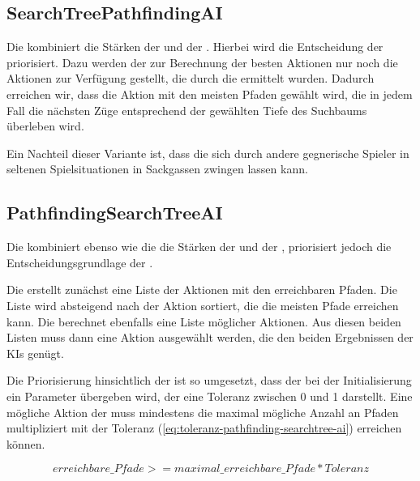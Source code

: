 \subsection{SearchTreePathfindingAI}
\label{subsec:searchtree-pathfinding-ai}

Die  kombiniert die Stärken der  und der .
Hierbei wird die Entscheidung der  priorisiert.
Dazu werden der  zur Berechnung der besten Aktionen nur noch die Aktionen zur Verfügung gestellt,
die durch die  ermittelt wurden.
Dadurch erreichen wir, dass die Aktion mit den meisten Pfaden gewählt wird, die in jedem Fall die nächsten Züge
entsprechend der gewählten Tiefe des Suchbaums überleben wird.

Ein Nachteil dieser Variante ist, dass die  sich durch andere gegnerische Spieler in
seltenen Spielsituationen in Sackgassen zwingen lassen kann.

\subsection{PathfindingSearchTreeAI}
\label{subsec:pathfinding-searchtree-ai}

Die  kombiniert ebenso wie die  die Stärken der
 und der , priorisiert jedoch die Entscheidungsgrundlage der
.

Die  erstellt zunächst eine Liste der Aktionen mit den erreichbaren Pfaden.
Die Liste wird absteigend nach der Aktion sortiert, die die meisten Pfade erreichen kann.
Die  berechnet ebenfalls eine Liste möglicher Aktionen.
Aus diesen beiden Listen muss dann eine Aktion ausgewählt werden, die den beiden Ergebnissen der \ac{KI}s genügt.

Die Priorisierung hinsichtlich der  ist so umgesetzt, dass der  bei
der Initialisierung ein Parameter übergeben wird, der eine Toleranz zwischen 0 und 1 darstellt.
Eine mögliche Aktion der  muss mindestens die maximal mögliche Anzahl an Pfaden multipliziert mit der
Toleranz (\ref{eq:toleranz-pathfinding-searchtree-ai}) erreichen können.

\begin{equation}
\label{eq:toleranz-pathfinding-searchtree-ai}
erreichbare\_Pfade >= maximal\_erreichbare\_Pfade * Toleranz
\end{equation}

